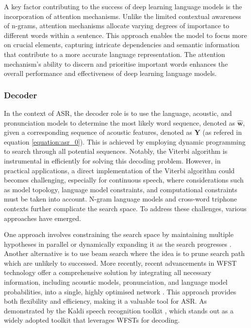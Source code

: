 A key factor contributing to the success of deep learning language models is the incorporation of attention mechanisms. Unlike the limited contextual awareness of n-grams, attention mechanisms allocate varying degrees of importance to different words within a sentence. This approach enables the model to focus more on crucial elements, capturing intricate dependencies and semantic information that contribute to a more accurate language representation. The attention mechanism's ability to discern and prioritise important words enhances the overall performance and effectiveness of deep learning language models.


\subsubsection{Decoder}%

In the context of \ac{ASR}, the decoder role is to use the language, acoustic, and pronunciation models to determine the most likely word sequence, denoted as $\boldsymbol{\hat{w}}$, given a corresponding sequence of acoustic features, denoted as $\boldsymbol{Y}$ (as refered in equation \ref{equation:asr_0}). This is achieved by employing dynamic programming to search through all potential sequences. Notably, the Viterbi algorithm \cite{viterbi_decoder} is instrumental in efficiently for solving this decoding problem. However, in practical applications, a direct implementation of the Viterbi algorithm could becomes challenging, especially for continuous speech, where considerations such as model topology, language model constraints, and computational constraints must be taken into account. N-gram language models and cross-word triphone contexts further complicate the search space. To address these challenges, various approaches have emerged. 

One approach involves constraining the search space by maintaining multiple hypotheses in parallel \cite{valtchev1994novel} or dynamically expanding it as the search progresses \cite{aubert1995large}. Another alternative is to use beam search where the idea is to prune search path which are unlikely to successed. More recently, recent advancements in \ac{WFST} technology offer a comprehensive solution by integrating all necessary information, including acoustic models, pronunciation, and language model probabilities, into a single, highly optimised network \cite{mohri1997finite,caseiro2002using}. This approach provides both flexibility and efficiency, making it a valuable tool for \ac{ASR}. As demonstrated by the Kaldi speech recognition toolkit \cite{kaldi}, which  stands out as a widely adopted toolkit that leverages \acp{WFST} for decoding. 

